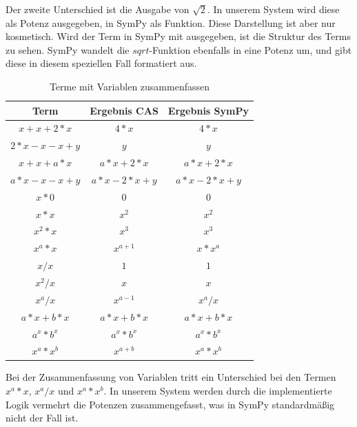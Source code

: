 \documentclass[11pt,a4paper, ngerman]{article}
\begin{document}
Der zweite Unterschied ist die Ausgabe von $\sqrt{2}$. In unserem System wird diese als Potenz ausgegeben, in SymPy als Funktion. Diese Darstellung ist aber nur kosmetisch. Wird der Term in SymPy mit  ausgegeben, ist die Struktur des Terms zu sehen. SymPy wandelt die $sqrt$-Funktion ebenfalls in eine Potenz um, und gibt diese in diesem speziellen Fall formatiert aus.

\begin{table}[h!]
    \caption{Terme mit Variablen zusammenfassen}
    \centering
    \begin{tabular}{|c|c|c|}
        \hline
        \textbf{Term} & \textbf{Ergebnis CAS} & \textbf{Ergebnis SymPy} \\
        \hline
        $x+x+2*x$ & $4*x$ & $4*x$ \\
        \hline
        $2*x-x-x+y$ & $y$ & $y$ \\
        \hline
        $x+x+a*x$ & $a*x+2*x$ & $a*x + 2*x$ \\
        \hline
        $a*x-x-x+y$ & $a*x-2*x+y$ & $a*x - 2*x + y$ \\
        \hline
        $x*0$ & $0$ & $0$ \\
        \hline
        $x*x$ & $x^2$ & $x^2$ \\
        \hline
        $x^2*x$ & $x^3$ & $x^3$ \\
        \hline
        $x^a*x$ & $x^{a+1}$ & $x*x^a$ \\
        \hline
        $x/x$ & $1$ & $1$ \\
        \hline
        $x^2/x$ & $x$ & $x$ \\
        \hline
        $x^a/x$ & $x^{a-1}$ & $x^a/x$ \\
        \hline
        $a*x+b*x$ & $a*x+b*x$ & $a*x+b*x$ \\
        \hline
        $a^x*b^x$ & $a^x*b^x$ & $a^x*b^x$ \\
        \hline
        $x^a*x^b$ & $x^{a+b}$ & $x^a*x^b$ \\
        \hline
    \end{tabular}
\end{table}

Bei der Zusammenfassung von Variablen tritt ein Unterschied bei den Termen $x^a*x$, $x^a/x$ und $x^a*x^b$. In unserem System werden durch die implementierte Logik vermehrt die Potenzen zusammengefasst, was in SymPy standardmäßig nicht der Fall ist.
\end{document}
